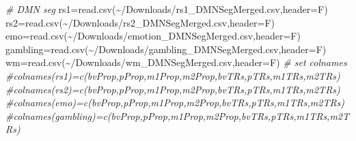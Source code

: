 \documentclass[
]{article}
\newenvironment{Shaded}{\begin{snugshade}}{\end{snugshade}}
\newcommand{\AttributeTok}[1]{\textcolor[rgb]{0.77,0.63,0.00}{#1}}
\newcommand{\CommentTok}[1]{\textcolor[rgb]{0.56,0.35,0.01}{\textit{#1}}}
\newcommand{\FunctionTok}[1]{\textcolor[rgb]{0.00,0.00,0.00}{#1}}
\newcommand{\NormalTok}[1]{#1}
\newcommand{\OtherTok}[1]{\textcolor[rgb]{0.56,0.35,0.01}{#1}}
\newcommand{\StringTok}[1]{\textcolor[rgb]{0.31,0.60,0.02}{#1}}
\begin{document}
\begin{Shaded}
\begin{Highlighting}[]
\CommentTok{\# DMN seg}
\NormalTok{rs1}\OtherTok{=}\FunctionTok{read.csv}\NormalTok{(}\StringTok{\textquotesingle{}\textasciitilde{}/Downloads/rs1\_DMNSegMerged.csv\textquotesingle{}}\NormalTok{,}\AttributeTok{header=}\NormalTok{F)}
\NormalTok{rs2}\OtherTok{=}\FunctionTok{read.csv}\NormalTok{(}\StringTok{\textquotesingle{}\textasciitilde{}/Downloads/rs2\_DMNSegMerged.csv\textquotesingle{}}\NormalTok{,}\AttributeTok{header=}\NormalTok{F)}
\NormalTok{emo}\OtherTok{=}\FunctionTok{read.csv}\NormalTok{(}\StringTok{\textquotesingle{}\textasciitilde{}/Downloads/emotion\_DMNSegMerged.csv\textquotesingle{}}\NormalTok{,}\AttributeTok{header=}\NormalTok{F)}
\NormalTok{gambling}\OtherTok{=}\FunctionTok{read.csv}\NormalTok{(}\StringTok{\textquotesingle{}\textasciitilde{}/Downloads/gambling\_DMNSegMerged.csv\textquotesingle{}}\NormalTok{,}\AttributeTok{header=}\NormalTok{F)}
\NormalTok{wm}\OtherTok{=}\FunctionTok{read.csv}\NormalTok{(}\StringTok{\textquotesingle{}\textasciitilde{}/Downloads/wm\_DMNSegMerged.csv\textquotesingle{}}\NormalTok{,}\AttributeTok{header=}\NormalTok{F)}
\CommentTok{\# set colnames}
\CommentTok{\#colnames(rs1)=c(\textquotesingle{}bvProp\textquotesingle{},\textquotesingle{}pProp\textquotesingle{},\textquotesingle{}m1Prop\textquotesingle{},\textquotesingle{}m2Prop\textquotesingle{},\textquotesingle{}bvTRs\textquotesingle{},\textquotesingle{}pTRs\textquotesingle{},\textquotesingle{}m1TRs\textquotesingle{},\textquotesingle{}m2TRs\textquotesingle{})}
\CommentTok{\#colnames(rs2)=c(\textquotesingle{}bvProp\textquotesingle{},\textquotesingle{}pProp\textquotesingle{},\textquotesingle{}m1Prop\textquotesingle{},\textquotesingle{}m2Prop\textquotesingle{},\textquotesingle{}bvTRs\textquotesingle{},\textquotesingle{}pTRs\textquotesingle{},\textquotesingle{}m1TRs\textquotesingle{},\textquotesingle{}m2TRs\textquotesingle{})}
\CommentTok{\#colnames(emo)=c(\textquotesingle{}bvProp\textquotesingle{},\textquotesingle{}pProp\textquotesingle{},\textquotesingle{}m1Prop\textquotesingle{},\textquotesingle{}m2Prop\textquotesingle{},\textquotesingle{}bvTRs\textquotesingle{},\textquotesingle{}pTRs\textquotesingle{},\textquotesingle{}m1TRs\textquotesingle{},\textquotesingle{}m2TRs\textquotesingle{})}
\CommentTok{\#colnames(gambling)=c(\textquotesingle{}bvProp\textquotesingle{},\textquotesingle{}pProp\textquotesingle{},\textquotesingle{}m1Prop\textquotesingle{},\textquotesingle{}m2Prop\textquotesingle{},\textquotesingle{}bvTRs\textquotesingle{},\textquotesingle{}pTRs\textquotesingle{},\textquotesingle{}m1TRs\textquotesingle{},\textquotesingle{}m2TRs\textquotesingle{})}

\end{Highlighting}
\end{Shaded}
\end{document}
